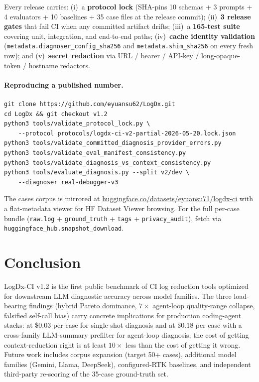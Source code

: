 \documentclass{article}
\begin{document}
Every release carries: (i)~a \textbf{protocol lock} (SHA-pins 10
schemas + 3 prompts + 4 evaluators + 10 baselines + 35 case files
at the release commit); (ii)~\textbf{3 release gates} that fail CI
when any committed artifact drifts; (iii)~a \textbf{165-test suite}
covering unit, integration, and end-to-end paths;
(iv)~\textbf{cache identity validation}
(\texttt{metadata.diagnoser\_config\_sha256} and
\texttt{metadata.shim\_sha256} on every fresh row); and
(v)~\textbf{secret redaction} via URL / bearer / API-key /
long-opaque-token / hostname redactors.

\paragraph{Reproducing a published number.}

\begin{verbatim}
git clone https://github.com/eyuansu62/LogDx.git
cd LogDx && git checkout v1.2
python3 tools/validate_protocol_lock.py \
    --protocol protocols/logdx-ci-v2-partial-2026-05-20.lock.json
python3 tools/validate_committed_diagnosis_provider_errors.py
python3 tools/validate_eval_manifest_consistency.py
python3 tools/validate_diagnosis_vs_context_consistency.py
python3 tools/evaluate_diagnosis.py --split v2/dev \
    --diagnoser real-debugger-v3
\end{verbatim}

The cases corpus is mirrored at
\href{https://huggingface.co/datasets/eyuansu71/logdx-ci}{huggingface.co/datasets/eyuansu71/logdx-ci}
with a flat-metadata viewer for HF Dataset Viewer browsing. For the
full per-case bundle (\texttt{raw.log} + \texttt{ground\_truth} +
\texttt{tags} + \texttt{privacy\_audit}), fetch via
\texttt{huggingface\_hub.snapshot\_download}.

\section{Conclusion}

LogDx-CI v1.2 is the first public benchmark of CI log reduction
tools optimized for downstream LLM diagnostic accuracy across model
families. The three load-bearing findings (hybrid Pareto dominance,
$7\times$ agent-loop quality-range collapse, falsified self-call
bias) carry concrete implications for production coding-agent
stacks: at \$0.03 per case for single-shot diagnosis and at \$0.18
per case with a cross-family LLM-summary prefilter for agent-loop
diagnosis, the cost of getting context-reduction right is at least
$10\times$ less than the cost of getting it wrong. Future work
includes corpus expansion (target 50+ cases), additional model
families (Gemini, Llama, DeepSeek), configured-RTK baselines, and
independent third-party re-scoring of the 35-case ground-truth set.
\end{document}

